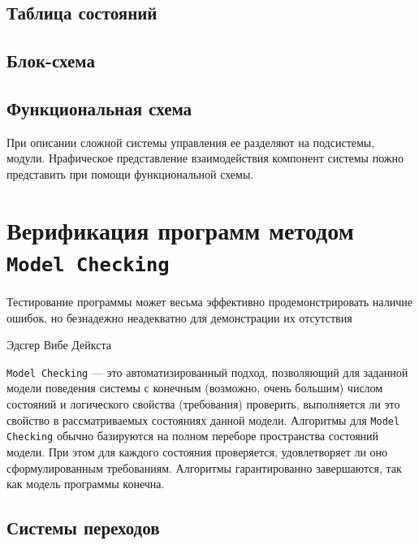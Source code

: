 \documentclass[12pt, twoside]{report}
\begin{document}
\section*{Таблица состояний}

\section*{Блок-схема}

\section*{Функциональная схема}

При описании сложной системы управления ее разделяют на подсистемы, модули. Нрафическое представление взаимодействия компонент системы пожно представить при помощи функциональной схемы.

\chapter*{Верификация программ методом \texttt{Model Checking}}

\epigraph{Тестирование программы может весьма эффективно продемонстрировать наличие ошибок, но безнадежно неадекватно для демонстрации их отсутствия}{Эдсгер Вибе Дейкста}


\texttt{Model Checking\cite{Shalito:ModelChecking}} — это автоматизированный подход, позволяющий для заданной модели поведения 
системы с конечным (возможно, очень большим) числом состояний и логического свойства 
(требования) проверить, выполняется ли это свойство в рассматриваемых состояниях данной модели.
Алгоритмы для \texttt{Model Checking} обычно базируются на полном переборе пространства состояний модели. 
При этом для каждого состояния проверяется, удовлетворяет ли оно сформулированным требованиям. 
Алгоритмы гарантированно завершаются, так как модель программы конечна.

\newpage
\section*{Системы переходов\cite{Mironov:ModelChecking}}
\label{system_SEQUENCE}
\end{document}
